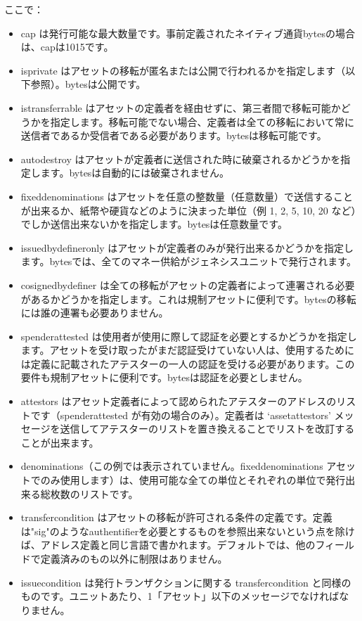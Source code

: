 \documentclass[a4paper, dvipdfmx]{jsarticle}
\begin{document}
\noindent ここで：
\begin{itemize}
    \item cap は発行可能な最大数量です。事前定義されたネイティブ通貨bytesの場合は、capは1015です。
    \item is\textunderscore private はアセットの移転が匿名または公開で行われるかを指定します（以下参照）。bytesは公開です。
    \item is\textunderscore transferrable はアセットの定義者を経由せずに、第三者間で移転可能かどうかを指定します。移転可能でない場合、定義者は全ての移転において常に送信者であるか受信者である必要があります。bytesは移転可能です。
    \item auto\textunderscore destroy はアセットが定義者に送信された時に破棄されるかどうかを指定します。bytesは自動的には破棄されません。
    \item fixed\textunderscore denominations はアセットを任意の整数量（任意数量）で送信することが出来るか、紙幣や硬貨などのように決まった単位（例 1, 2, 5, 10, 20 など）でしか送信出来ないかを指定します。bytesは任意数量です。
    \item issued\textunderscore by\textunderscore definer\textunderscore only はアセットが定義者のみが発行出来るかどうかを指定します。bytesでは、全てのマネー供給がジェネシスユニットで発行されます。
    \item cosigned\textunderscore by\textunderscore definer は全ての移転がアセットの定義者によって連署される必要があるかどうかを指定します。これは規制アセットに便利です。bytesの移転には誰の連署も必要ありません。
    \item spender\textunderscore attested は使用者が使用に際して認証を必要とするかどうかを指定します。アセットを受け取ったがまだ認証受けていない人は、使用するためには定義に記載されたアテスターの一人の認証を受ける必要があります。この要件も規制アセットに便利です。bytesは認証を必要としません。
    \item attestors はアセット定義者によって認められたアテスターのアドレスのリストです（spender\textunderscore attested が有効の場合のみ）。定義者は ‘asset\textunderscore attestors’ メッセージを送信してアテスターのリストを置き換えることでリストを改訂することが出来ます。
    \item denominations（この例では表示されていません。fixed\textunderscore denominations アセットでのみ使用します）は、使用可能な全ての単位とそれぞれの単位で発行出来る総枚数のリストです。
    \item transfer\textunderscore condition はアセットの移転が許可される条件の定義です。定義は"sig"のようなauthentifierを必要とするものを参照出来ないという点を除けば、アドレス定義と同じ言語で書かれます。デフォルトでは、他のフィールドで定義済みのもの以外に制限はありません。
    \item issue\textunderscore condition は発行トランザクションに関する transfer\textunderscore condition と同様のものです。ユニットあたり、1「アセット」以下のメッセージでなければなりません。
\end{itemize}
\end{document}
